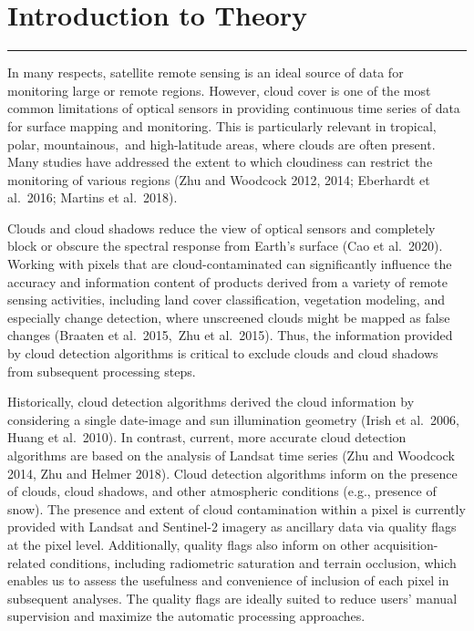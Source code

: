 \documentclass[
  letterpaper,
  DIV=11,
  numbers=noendperiod]{scrreprt}
\begin{document}
\hypertarget{introduction-to-theory-5}{%
\section*{Introduction to Theory}\label{introduction-to-theory-5}}


\begin{center}\rule{0.5\linewidth}{0.5pt}\end{center}

In many respects, satellite remote sensing is an ideal source of data
for monitoring large or remote regions. However, cloud cover is one of
the most common limitations of optical sensors in providing continuous
time series of data for surface mapping and monitoring. This is
particularly relevant in tropical, polar, mountainous,~and high-latitude
areas, where clouds are often present. Many studies have addressed the
extent to which cloudiness can restrict the monitoring of various
regions (Zhu and Woodcock 2012, 2014; Eberhardt et al.~2016; Martins et
al.~2018).

Clouds and cloud shadows reduce the view of optical sensors and
completely block or obscure the spectral response from Earth's surface
(Cao et al.~2020). Working with pixels that are cloud-contaminated can
significantly influence the accuracy and information content of products
derived from a variety of remote sensing activities, including land
cover classification, vegetation modeling, and especially change
detection, where unscreened clouds might be mapped as false changes
(Braaten et al.~2015,~Zhu et al.~2015). Thus, the information provided
by cloud detection algorithms is critical to exclude clouds and cloud
shadows from subsequent processing steps.

Historically, cloud detection algorithms derived the cloud information
by considering a single date-image and sun illumination geometry (Irish
et al.~2006, Huang et al.~2010). In contrast, current, more accurate
cloud detection algorithms are based on the analysis of Landsat time
series (Zhu and Woodcock 2014, Zhu and Helmer 2018). Cloud detection
algorithms inform on the presence of clouds, cloud shadows, and other
atmospheric conditions (e.g., presence of snow). The presence and extent
of cloud contamination within a pixel is currently provided with Landsat
and Sentinel-2 imagery as ancillary data via quality flags at the pixel
level. Additionally, quality flags also inform on other
acquisition-related conditions, including radiometric saturation and
terrain occlusion, which enables us to assess the usefulness and
convenience of inclusion of each pixel in subsequent analyses. The
quality flags are ideally suited to reduce users' manual supervision and
maximize the automatic processing approaches.
\end{document}
